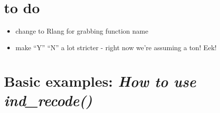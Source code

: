 \hypertarget{to-do}{%
\section{to do}\label{to-do}}

\begin{itemize}
\tightlist
\item
  change to Rlang for grabbing function name
\item
  make ``Y'' ``N'' a lot stricter - right now we're assuming a ton! Eek!
\end{itemize}

\hypertarget{basic-examples-how-to-use-ind_recode}{%
\section{\texorpdfstring{Basic examples: \emph{How to use
ind\_recode()}}{Basic examples: How to use ind\_recode()}}\label{basic-examples-how-to-use-ind_recode}}

